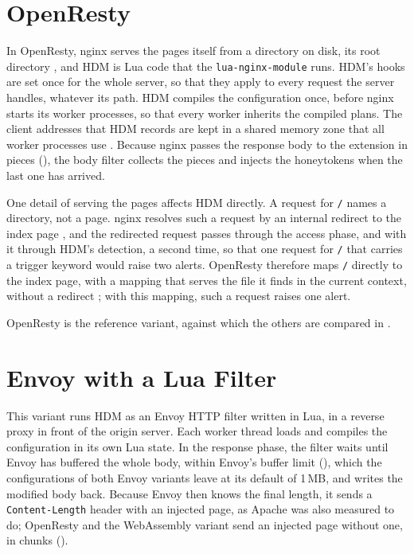 \documentclass{rptuma}
\begin{document}
\section{OpenResty}
\label{sec:impl.openresty}

In OpenResty, nginx serves the pages itself from a directory on disk, its root directory
\cite{nginx_core}, and HDM is Lua code that the \texttt{lua-nginx-module} runs. HDM's hooks are set once for the whole server, so that they apply to every request the server
handles, whatever its path. HDM compiles the configuration once, before nginx starts its worker
processes, so that every worker inherits the compiled plans. The client addresses that HDM records
are kept in a shared memory zone that all worker processes use \cite{luanginx}. Because nginx passes
the response body to the extension in pieces (), the body filter
collects the pieces and injects the honeytokens when the last one has arrived.

One detail of serving the pages affects HDM directly. A request for \texttt{/} names a directory,
not a page. nginx resolves such a request by an internal redirect to the index page
\cite{nginx_index}, and the redirected request passes through
the access phase, and with it through HDM's detection, a second time, so that one request for
\texttt{/} that carries a trigger keyword would raise two alerts. OpenResty therefore maps \texttt{/} directly to the index page, with a mapping that
serves the file it finds in the current context, without a redirect \cite{nginx_core}; with this mapping, such a request raises one alert.

OpenResty is the reference variant, against which the others are compared in
.

\section{Envoy with a Lua Filter}
\label{sec:impl.envoylua}

This variant runs HDM as an Envoy HTTP filter written in Lua, in a reverse proxy in front of the
origin server. Each worker thread loads and compiles the configuration in its own Lua state. In the
response phase, the filter waits until Envoy has buffered the whole body, within Envoy's buffer
limit (), which the configurations of both Envoy variants leave at its
default of 1\,MB, and writes the modified body back. Because Envoy then
knows the final length, it sends a \texttt{Content-Length} header with an injected page, as Apache was also measured to do; OpenResty and the WebAssembly variant send an injected
page without one, in chunks (). 
\end{document}
